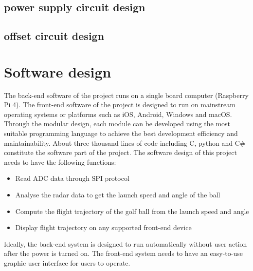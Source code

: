 \subsection{power supply circuit design}
\subsection{offset circuit design}

\newpage
\section{Software design}
The back-end software of the project runs on a single board computer (Raspberry Pi 4). The front-end software of the project is designed to run on mainstream operating systems or platforms such as iOS, Android, Windows and macOS. Through the modular design, each module can be developed using the most suitable programming language to achieve the best development efficiency and maintainability. About three thousand lines of code including C, python and C\# constitute the software part of the project. The software design of this project needs to have the following functions: 
\begin{itemize}[noitemsep,topsep=0pt]
   \item  Read ADC data through SPI protocol
   \item Analyse the radar data to get the launch speed and angle of the ball
   \item Compute the flight trajectory of the golf ball from the launch speed and angle
   \item Display flight trajectory on any supported front-end device
\end{itemize}
   
Ideally, the back-end system is designed to run automatically without user action after the power is turned on. The front-end system needs to have an easy-to-use graphic user interface for users to operate.

